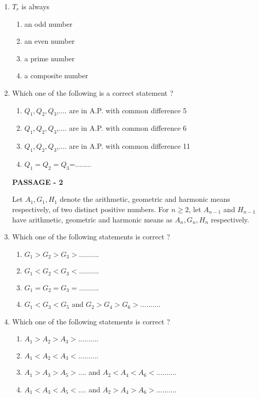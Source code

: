 \begin{enumerate}[label=\arabic*.,ref=\thesubsection.\theenumi]
\item $T_r$ is always 

\begin{enumerate}
\item an odd number          
\item an even number    
\item a prime number 
\item a composite number
\end{enumerate}

\item Which one of the following is a correct statement ?

\begin{enumerate}
\item $Q_1, Q_2, Q_3$,.... are in A.P. with common difference 5
\item $Q_1, Q_2, Q_3$,.... are in A.P. with common difference 6
\item $Q_1, Q_2, Q_3$,.... are in A.P. with common difference 11
\item $Q_1= Q_2=Q_3$=........
\end{enumerate}

\textbf {PASSAGE - 2}
               
Let $A_1, G_1, H_1$ denote the arithmetic, geometric and harmonic means respectively, of two distinct positive numbers. For $n\geq 2$, let $A_{n-1}$ and $H_{n-1}$  have  arithmetic, geometric and harmonic means as $A_n,G_n,H_n$ respectively.

\item Which one of the following statements is correct ?

\begin{enumerate}
\item $G_1 > G_2 > G_3 >..........$    
\item $G_1 < G_2 < G_3 <..........$      
\item $G_1 = G_2 = G_3 =..........$    
\item $G_1 < G_3 < G_5$ and $G_2 > G_4 > G_6 >..........$
\end{enumerate}

\item Which one of the following statements is correct ?

\begin{enumerate}
\item $A_1 > A_2 > A_3 >..........$    
\item $A_1 < A_2 < A_3 <..........$         
\item $A_1 > A_3 > A_5>....$ and $A_2 < A_4 < A_6 <..........$
\item $A_1 < A_3 < A_5<....$ and $A_2 > A_4 > A_6 >..........$
\end{enumerate}


\end{enumerate}

